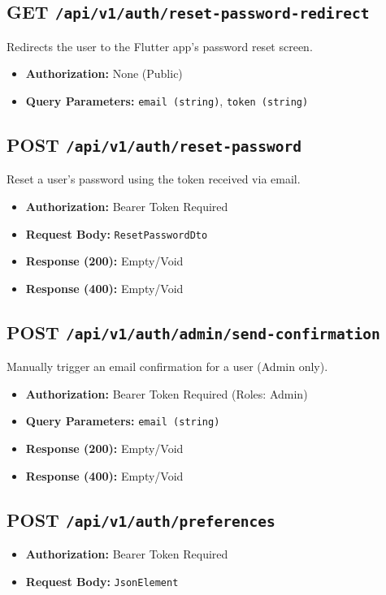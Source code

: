 \subsection{GET \texttt{/api/v1/auth/reset-password-redirect}}
Redirects the user to the Flutter app's password reset screen.
\begin{itemize}
    \item \textbf{Authorization:} None (Public)
    \item \textbf{Query Parameters:} \texttt{email (string)}, \texttt{token (string)}
\end{itemize}

\subsection{POST \texttt{/api/v1/auth/reset-password}}
Reset a user's password using the token received via email.
\begin{itemize}
    \item \textbf{Authorization:} Bearer Token Required
    \item \textbf{Request Body:} \texttt{ResetPasswordDto}
    \item \textbf{Response (200):} Empty/Void
    \item \textbf{Response (400):} Empty/Void
\end{itemize}

\subsection{POST \texttt{/api/v1/auth/admin/send-confirmation}}
Manually trigger an email confirmation for a user (Admin only).
\begin{itemize}
    \item \textbf{Authorization:} Bearer Token Required (Roles: Admin)
    \item \textbf{Query Parameters:} \texttt{email (string)}
    \item \textbf{Response (200):} Empty/Void
    \item \textbf{Response (400):} Empty/Void
\end{itemize}

\subsection{POST \texttt{/api/v1/auth/preferences}}
\begin{itemize}
    \item \textbf{Authorization:} Bearer Token Required
    \item \textbf{Request Body:} \texttt{JsonElement}
\end{itemize}

